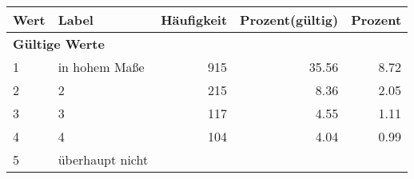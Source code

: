      \begin{longtable}{lXrrr}
     \toprule
     \textbf{Wert} & \textbf{Label} & \textbf{Häufigkeit} & \textbf{Prozent(gültig)} & \textbf{Prozent} \\
     \endhead
     \midrule
     \multicolumn{5}{l}{\textbf{Gültige Werte}}\\

     1 &
     \multicolumn{1}{X}{ in hohem Maße   } &


       \num{915} &
       \num[round-mode=places,round-precision=2]{35.56} &
         \num[round-mode=places,round-precision=2]{8.72} \\

     2 &
     \multicolumn{1}{X}{ 2   } &


       \num{215} &
       \num[round-mode=places,round-precision=2]{8.36} &
         \num[round-mode=places,round-precision=2]{2.05} \\

     3 &
     \multicolumn{1}{X}{ 3   } &


       \num{117} &
       \num[round-mode=places,round-precision=2]{4.55} &
         \num[round-mode=places,round-precision=2]{1.11} \\

     4 &
     \multicolumn{1}{X}{ 4   } &


       \num{104} &
       \num[round-mode=places,round-precision=2]{4.04} &
         \num[round-mode=places,round-precision=2]{0.99} \\

     5 &
     \multicolumn{1}{X}{ überhaupt nicht   } &



\end{longtable}
